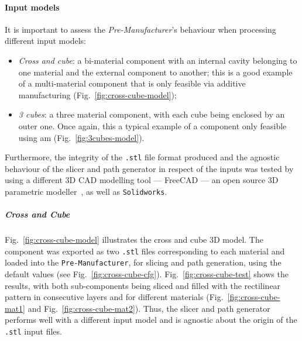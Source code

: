 \paragraph{Input models}
It is important to assess the \emph{Pre-Manufacturer}'s behaviour when processing different input models:
\begin{itemize}
\item \emph{Cross and cube}: a bi-material component with an
internal cavity belonging to one material and the external component to another;
this is a good example of a multi-material component that is only feasible via
additive manufacturing (Fig.~\ref{fig:cross-cube-model});
\item \emph{3 cubes}: a three material component, with each cube being enclosed
  by an outer one. Once again, this a typical example of a component only
  feasible using \gls{am} (Fig.~\ref{fig:3cubes-model}).
\end{itemize}

Furthermore, the integrity of the \texttt{.stl} file format
produced and the agnostic behaviour of the slicer and path generator in respect
of the inputs was tested by using a different 3D CAD modelling tool --- FreeCAD
--- an open source 3D parametric modeller~\cite{freecad}, as well as \texttt{Solidworks}.

\subparagraph{Cross and Cube}
Fig.~\ref{fig:cross-cube-model} illustrates the cross and cube 3D model.
The component was exported as two \texttt{.stl} files
corresponding to each material and loaded into the \texttt{Pre-Manufacturer},
for slicing and path generation, using the default values (see Fig.~\ref{fig:cross-cube-cfg}).
Fig.~\ref{fig:cross-cube-test} shows the results, with both sub-components being sliced and filled
with the rectilinear pattern in consecutive layers and for different materials
(Fig.~\ref{fig:cross-cube-mat1} and Fig.~\ref{fig:cross-cube-mat2}). Thus, the slicer and path generator performs well with a different
input model and is agnostic about the origin of the \texttt{.stl} input files.

